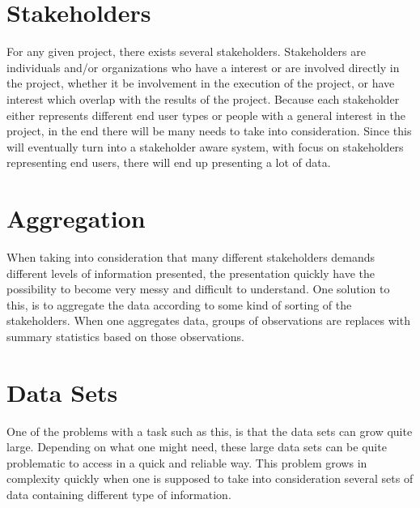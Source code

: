 \clearpage
\section{Stakeholders} %
\label{sec:intro_stakeholders}  
For any given project, there exists
several stakeholders. Stakeholders are individuals and/or organizations who have a interest or are involved directly in the
project, whether it be involvement in the execution of the project, or have interest which overlap
with the results of the project. Because each stakeholder either represents different end user 
types or people with a general interest in the project, in the end there will be many needs to 
take into consideration. Since this will eventually turn into a stakeholder aware system, with 
focus on stakeholders representing end users, there will end up presenting a lot of data. 

\section{Aggregation} %
\label{sec:intro_aggregation}
When taking into consideration that many different stakeholders demands different levels of
information presented, the presentation quickly have the possibility to become very messy and
difficult to understand. One solution to this, is to aggregate the data according to some kind of
sorting of the stakeholders. When one aggregates data, groups of observations are replaces with
summary statistics based on those observations\cite{ wiki:Aggregation}.

\section{Data Sets} %
\label{sec:intro_data_sets}
One of the problems with a task such as this, is that the data sets can grow quite large. Depending
on what one might need, these large data sets can be quite problematic to access in a quick and
reliable way. This problem grows in complexity quickly when one is supposed to take into
consideration several sets of data containing different type of information. 

